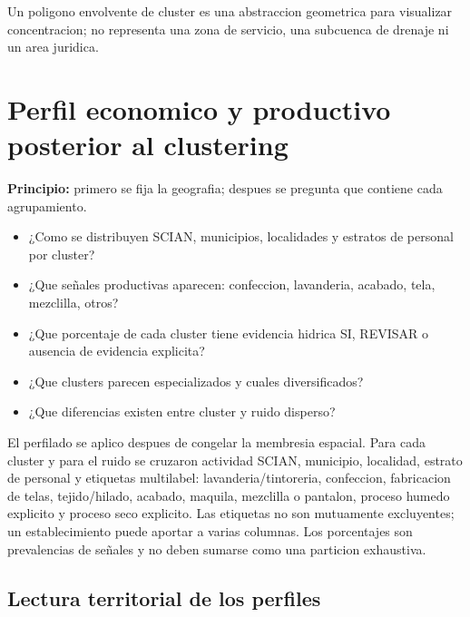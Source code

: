 \documentclass[11pt,letterpaper]{article}
\begin{document}
\begin{alerta}
Un poligono envolvente de cluster es una abstraccion geometrica para visualizar concentracion; no representa una zona de servicio, una subcuenca de drenaje ni un area juridica.
\end{alerta}

\section{Perfil economico y productivo posterior al clustering}

\textbf{Principio:} primero se fija la geografia; despues se pregunta que contiene cada agrupamiento.

\begin{preguntas}
\begin{itemize}
    \item ¿Como se distribuyen SCIAN, municipios, localidades y estratos de personal por cluster?
    \item ¿Que señales productivas aparecen: confeccion, lavanderia, acabado, tela, mezclilla, otros?
    \item ¿Que porcentaje de cada cluster tiene evidencia hidrica SI, REVISAR o ausencia de evidencia explicita?
    \item ¿Que clusters parecen especializados y cuales diversificados?
    \item ¿Que diferencias existen entre cluster y ruido disperso?
\end{itemize}
\end{preguntas}

El perfilado se aplico despues de congelar la membresia espacial. Para cada cluster y para el ruido se cruzaron actividad SCIAN, municipio, localidad, estrato de personal y etiquetas multilabel: lavanderia/tintoreria, confeccion, fabricacion de telas, tejido/hilado, acabado, maquila, mezclilla o pantalon, proceso humedo explicito y proceso seco explicito. Las etiquetas no son mutuamente excluyentes; un establecimiento puede aportar a varias columnas. Los porcentajes son prevalencias de señales y no deben sumarse como una particion exhaustiva.

\subsection{Lectura territorial de los perfiles}
\end{document}
